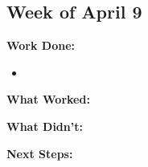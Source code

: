 \subsection{Week of April 9}

\textbf{Work Done:}
\begin{itemize}
    \item 
\end{itemize}

\textbf{What Worked:}

\textbf{What Didn't:}

\textbf{Next Steps:}